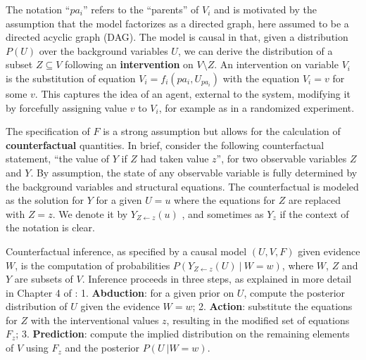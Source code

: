 
The notation ``$pa_i$'' refers to the ``parents'' of $V_i$ and is
motivated by the assumption that the model factorizes as a directed
graph, here assumed to be a directed acyclic graph (DAG).  The model
is causal in that, given a distribution $P(U)$ over the background
variables $U$, we can derive the distribution of a subset $Z \subseteq
V$ following an {\bf intervention} on $V\setminus Z$.  An 
  intervention on variable $V_i$ is the substitution of equation $V_i
= f_i(pa_i, U_{pa_i})$ with the equation $V_i = v$ for some $v$. This
captures the idea of an agent, external to the system, modifying it by
forcefully assigning value $v$ to $V_i$,
for example as in a randomized experiment.

The specification of $F$ is a strong assumption but allows for the
calculation of {\bf counterfactual} quantities.  In brief, consider
the following counterfactual statement, ``the value of $Y$ if $Z$ had
taken value $z$'', for two observable variables $Z$ and $Y$. By
assumption, the state of any observable variable is fully determined
by the background variables and structural equations. The
counterfactual is modeled as the solution for $Y$ for a given $U = u$
where the equations for $Z$ are replaced with $Z \!=\!  z$.  We denote
it by $Y_{Z \leftarrow z}(u)$ \cite{pearl:00}, and sometimes as $Y_z$
if the context of the notation is clear.

Counterfactual inference, as specified by a causal model $(U, V, F)$
given evidence $W$, is the computation of probabilities $P(Y_{Z
  \leftarrow z}(U)\ |\ W \!=\! w)$, where $W$, $Z$ and $Y$ are subsets
of $V$. Inference proceeds in three steps, as explained in more detail
in Chapter 4 of \citet{pearl:16}: 1. {\bf Abduction}: for a given
prior on $U$, compute the posterior distribution of $U$ given the
evidence $W = w$; 2. {\bf Action}: substitute the equations for $Z$
with the interventional values $z$, resulting in the modified set of
equations $F_z$; 3. {\bf Prediction}: compute the implied distribution
on the remaining elements of $V$ using $F_z$ and the posterior $P(U\ |
W = w)$.

